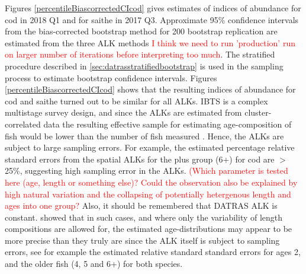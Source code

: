 \documentclass[a4paper 12pt]{article}
\numberwithin{equation}{section}
\newcommand{\ed}[1]{\textcolor{red}{#1}}
\begin{document}
Figures \ref{percentileBiascorrectedCIcod} gives estimates of indices of abundance for cod in  2018 Q1 and for saithe in  2017 Q3. Approximate 95\% confidence intervals from the bias-corrected bootstrap method for 200 bootstrap replication are estimated from the three ALK methods \ed{I think we need to run 'production' run on larger number of iterations before interpreting too much}. The stratified procedure described in \ref{sec:datrasstratifiedbootstrap} is used in the sampling process to estimate bootstrap confidence intervals.   Figures \ref{percentileBiascorrectedCIcod}  shows that the resulting indices of abundance for cod and saithe turned out to be similar for all ALKs. IBTS is a complex multistage survey design, and since the ALKs are estimated from cluster-correlated data the resulting effective sample for estimating age-composition of fish would be lower than the number of fish measured \citep{ICES2013PICS3}. Hence, the ALKs are subject to large sampling errors. For example, the estimated percentage relative standard errors from the spatial ALKs for the plus group (6+) for cod are $>$ 25\%, suggesting high sampling error in the ALKs. \ed{(Which parameter is tested here (age, length or something else)? Could the observation also be explained by high natural variation and the collapsing of potentially hetergenous length and ages into one group?} Also, it should be remembered that DATRAS ALK is constant.   \citet{aanes2015efficient} showed that in such cases, and where only the variability of  length compositions are allowed for, the estimated age-distributions may appear to be more precise than they truly are since the ALK itself is subject to sampling errors, see for example the estimated relative standard standard errors for ages 2, and the older fish (4, 5 and 6+) for both species. 

\end{document}
